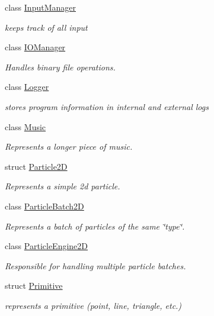 \begin{DoxyCompactItemize}
class \hyperlink{classnta_1_1InputManager}{Input\+Manager}
\begin{DoxyCompactList}\small\item\em keeps track of all input \end{DoxyCompactList}\item 
class \hyperlink{classnta_1_1IOManager}{I\+O\+Manager}
\begin{DoxyCompactList}\small\item\em Handles binary file operations. \end{DoxyCompactList}\item 
class \hyperlink{classnta_1_1Logger}{Logger}
\begin{DoxyCompactList}\small\item\em stores program information in internal and external logs \end{DoxyCompactList}\item 
class \hyperlink{classnta_1_1Music}{Music}
\begin{DoxyCompactList}\small\item\em Represents a longer piece of music. \end{DoxyCompactList}\item 
struct \hyperlink{structnta_1_1Particle2D}{Particle2D}
\begin{DoxyCompactList}\small\item\em Represents a simple 2d particle. \end{DoxyCompactList}\item 
class \hyperlink{classnta_1_1ParticleBatch2D}{Particle\+Batch2D}
\begin{DoxyCompactList}\small\item\em Represents a batch of particles of the same \char`\"{}type\char`\"{}. \end{DoxyCompactList}\item 
class \hyperlink{classnta_1_1ParticleEngine2D}{Particle\+Engine2D}
\begin{DoxyCompactList}\small\item\em Responsible for handling multiple particle batches. \end{DoxyCompactList}\item 
struct \hyperlink{structnta_1_1Primitive}{Primitive}
\begin{DoxyCompactList}\small\item\em represents a primitive (point, line, triangle, etc.) \end{DoxyCompactList}\item 

\end{DoxyCompactItemize}
